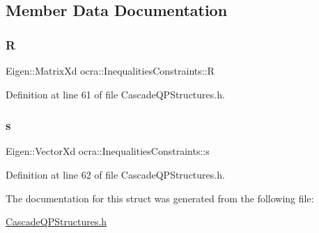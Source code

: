 \subsection{Member Data Documentation}
\hypertarget{structocra_1_1InequalitiesConstraints_a855a07da37932011602005e3af25aa76}{}\label{structocra_1_1InequalitiesConstraints_a855a07da37932011602005e3af25aa76} 
\subsubsection{\texorpdfstring{R}{R}}
{\footnotesize\ttfamily Eigen\+::\+Matrix\+Xd ocra\+::\+Inequalities\+Constraints\+::R}



Definition at line 61 of file Cascade\+Q\+P\+Structures.\+h.

\hypertarget{structocra_1_1InequalitiesConstraints_a26db4bbe606a537c1dedbc30a2ca8f36}{}\label{structocra_1_1InequalitiesConstraints_a26db4bbe606a537c1dedbc30a2ca8f36} 
\subsubsection{\texorpdfstring{s}{s}}
{\footnotesize\ttfamily Eigen\+::\+Vector\+Xd ocra\+::\+Inequalities\+Constraints\+::s}



Definition at line 62 of file Cascade\+Q\+P\+Structures.\+h.



The documentation for this struct was generated from the following file\+:\begin{DoxyCompactItemize}
\item 
\hyperlink{CascadeQPStructures_8h}{Cascade\+Q\+P\+Structures.\+h}\end{DoxyCompactItemize}
